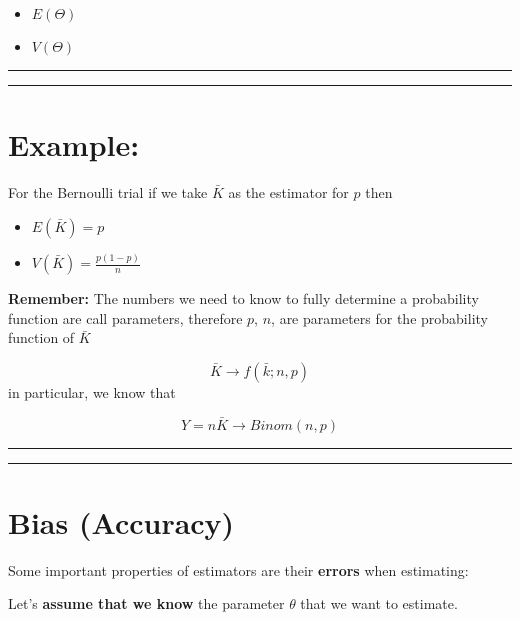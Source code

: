 \documentclass[
]{book}
\providecommand{\tightlist}{%
  \setlength{\itemsep}{0pt}\setlength{\parskip}{0pt}}
\begin{document}
\begin{itemize}
\tightlist
\item
  \(E(\Theta)\)\\
\item
  \(V(\Theta)\)
\end{itemize}

\begin{center}\rule{0.5\linewidth}{0.5pt}\end{center}

\begin{center}\rule{0.5\linewidth}{0.5pt}\end{center}

\hypertarget{example-14}{%
\section{Example:}\label{example-14}}

For the Bernoulli trial if we take \(\bar{K}\) as the estimator for \(p\) then

\begin{itemize}
\tightlist
\item
  \(E(\bar{K})=p\)
\item
  \(V(\bar{K})=\frac{p(1-p)}{n}\)
\end{itemize}

\textbf{Remember:} The numbers we need to know to fully determine a probability function are call parameters, therefore \(p\), \(n\), are parameters for the probability function of \(\bar{K}\)

\[\bar{K} \rightarrow f(\bar{k}; n, p)\]
in particular, we know that

\[Y=n\bar{K} \rightarrow Binom(n, p)\]

\begin{center}\rule{0.5\linewidth}{0.5pt}\end{center}

\begin{center}\rule{0.5\linewidth}{0.5pt}\end{center}

\hypertarget{bias-accuracy}{%
\section{Bias (Accuracy)}\label{bias-accuracy}}

Some important properties of estimators are their \textbf{errors} when estimating:

Let's \textbf{assume that we know} the parameter \(\theta\) that we want to estimate.
\end{document}
